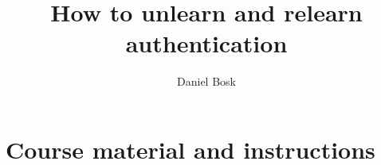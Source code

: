 \title{%
  How to unlearn and relearn authentication
}
\author{Daniel Bosk}

\begin{abstract}
  
\end{abstract}

\maketitle








\printbibliography

\appendix
\section{Course material and instructions}%
\label{course-material}


